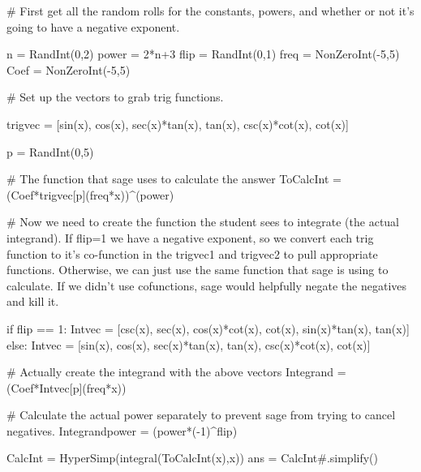 



\begin{sagesilent}
# First get all the random rolls for the constants, powers, and whether or not it's going to have a negative exponent.

n = RandInt(0,2)
power = 2*n+3
flip = RandInt(0,1)
freq = NonZeroInt(-5,5)
Coef = NonZeroInt(-5,5)

# Set up the vectors to grab trig functions.

trigvec = [sin(x), cos(x), sec(x)*tan(x), tan(x), csc(x)*cot(x), cot(x)]

p = RandInt(0,5)

# The function that sage uses to calculate the answer
ToCalcInt = (Coef*trigvec[p](freq*x))^(power)

# Now we need to create the function the student sees to integrate (the actual integrand). If flip=1 we have a negative exponent, so we convert each trig function to it's co-function in the trigvec1 and trigvec2 to pull appropriate functions. Otherwise, we can just use the same function that sage is using to calculate. If we didn't use cofunctions, sage would helpfully negate the negatives and kill it.

if flip == 1:
    Intvec = [csc(x), sec(x), cos(x)*cot(x), cot(x), sin(x)*tan(x), tan(x)]
else:
    Intvec = [sin(x), cos(x), sec(x)*tan(x), tan(x), csc(x)*cot(x), cot(x)]

# Actually create the integrand with the above vectors
Integrand = (Coef*Intvec[p](freq*x))

# Calculate the actual power separately to prevent sage from trying to cancel negatives.
Integrandpower = (power*(-1)^flip)



CalcInt = HyperSimp(integral(ToCalcInt(x),x))
ans = CalcInt#.simplify()

\end{sagesilent}

